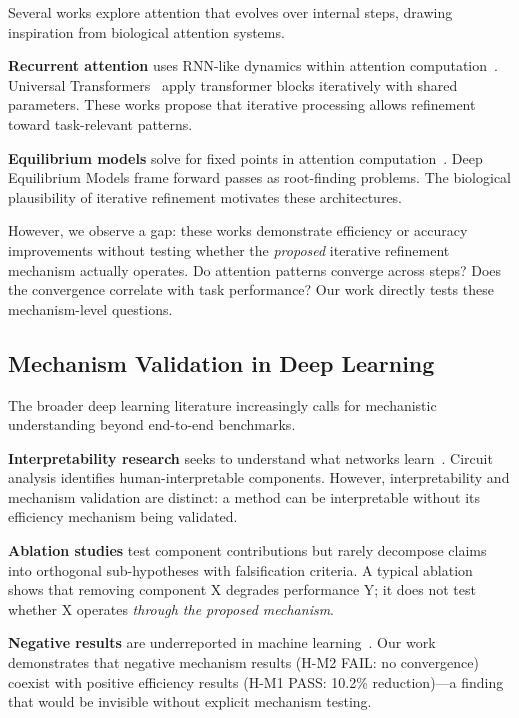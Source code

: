 Several works explore attention that evolves over internal steps, drawing inspiration from biological attention systems.

\textbf{Recurrent attention} uses RNN-like dynamics within attention computation~\cite{graves2016adaptive}. Universal Transformers~\cite{dehghani2019universal} apply transformer blocks iteratively with shared parameters. These works propose that iterative processing allows refinement toward task-relevant patterns.

\textbf{Equilibrium models} solve for fixed points in attention computation~\cite{bai2019deep,bai2020multiscale}. Deep Equilibrium Models frame forward passes as root-finding problems. The biological plausibility of iterative refinement motivates these architectures.

However, we observe a gap: these works demonstrate efficiency or accuracy improvements without testing whether the \emph{proposed} iterative refinement mechanism actually operates. Do attention patterns converge across steps? Does the convergence correlate with task performance? Our work directly tests these mechanism-level questions.

\subsection{Mechanism Validation in Deep Learning}

The broader deep learning literature increasingly calls for mechanistic understanding beyond end-to-end benchmarks.

\textbf{Interpretability research} seeks to understand what networks learn~\cite{olah2020zoom,elhage2021mathematical}. Circuit analysis identifies human-interpretable components. However, interpretability and mechanism validation are distinct: a method can be interpretable without its efficiency mechanism being validated.

\textbf{Ablation studies} test component contributions but rarely decompose claims into orthogonal sub-hypotheses with falsification criteria. A typical ablation shows that removing component X degrades performance Y; it does not test whether X operates \emph{through the proposed mechanism}.

\textbf{Negative results} are underreported in machine learning~\cite{henderson2018deep,dodge2019show}. Our work demonstrates that negative mechanism results (H-M2 FAIL: no convergence) coexist with positive efficiency results (H-M1 PASS: 10.2\% reduction)---a finding that would be invisible without explicit mechanism testing.

